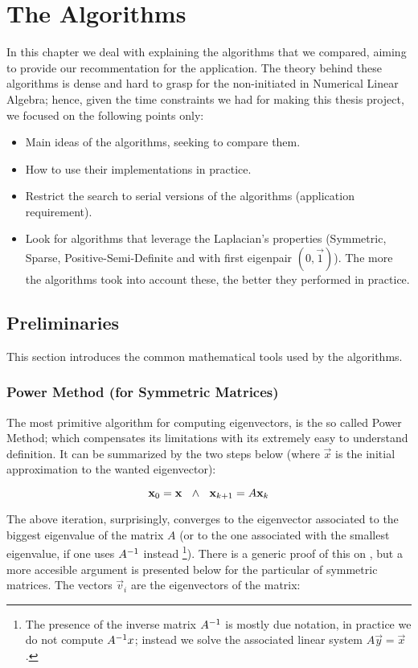 \chapter{The Algorithms}

In this chapter we deal with explaining the algorithms that we
compared, aiming to provide our recommentation for the
application. The theory behind these algorithms is dense and hard to
grasp for the non-initiated in Numerical Linear Algebra; hence, given
the time constraints we had for making this thesis project, we focused
on the following points only:

\begin{itemize}
\item Main ideas of the algorithms, seeking to compare them.
\item How to use their implementations in practice.
\item Restrict the search to serial versions of the algorithms
  (application requirement).
\item Look for algorithms that leverage the Laplacian's properties
  (Symmetric, Sparse, Positive-Semi-Definite and with first eigenpair
  $(0,\vec{1})$). The more the algorithms took into account these, the
  better they performed in practice. 
\end{itemize}

\section{Preliminaries}

This section introduces the common mathematical tools used by the
algorithms.

\subsection{Power Method (for Symmetric Matrices)}

The most primitive algorithm for computing eigenvectors, is the so
called Power Method; which compensates its limitations with its
extremely easy to understand definition. It can be summarized by the
two steps below (where $\vec{x}$ is the initial approximation to the
wanted eigenvector):

\begin{equation*}
    \mathbf{x}_0 = \mathbf{x} \,\,\,\,\land\,\,\,\,
    \mathbf{x}_{k+1} = A\mathbf{x}_k  
\end{equation*}
\joinbelow{1cm}

The above iteration, surprisingly, converges to the eigenvector
associated to the biggest eigenvalue of the matrix $A$ (or to the one
associated with the smallest eigenvalue, if one uses ${A}^{-1}$ instead
\footnote{The presence of the inverse matrix ${A}^{-1}$ is mostly due
  notation, in practice we do not compute ${A}^{-1}x$; instead we solve the
  associated linear system $A\vec{y} = \vec{x}$.}). There is a
generic proof of this on \cite{saad92}, but a more accesible argument
is presented below for the particular of symmetric matrices. The vectors
$\vec{v}_i$ are the eigenvectors of the matrix:

